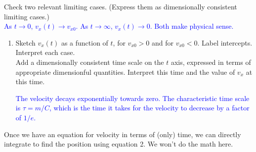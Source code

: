 \documentclass[11pt, letterpaper, openany]{book}
\newenvironment{exercise}[1][Exercise]{%
  \tcolorbox[blanker, breakable, left=1em,
    before skip=1em, after skip=1em,
    borderline west={3pt}{0pt}{PhysNavy},
    colback=PhysCream,
    before upper={\textcolor{PhysNavy}{\sffamily\bfseries #1:}\space}
  ]%
}{%
  \endtcolorbox%
}
\begin{document}
\begin{exercise}[Exercise 1]
Check two relevant limiting cases. (Express them as dimensionally consistent limiting cases.) \\
\textcolor{blue}{As $t \to 0$, $v_x(t) \to v_{x0}$. As $t \to \infty$, $v_x(t) \to 0$. Both make physical sense.}

\begin{enumerate}[label=(\alph*), resume]
    \item Sketch $v_x(t)$ as a function of $t$, for $v_{x0} > 0$ and for $v_{x0} < 0$. Label intercepts. Interpret each case. \\
    Add a dimensionally consistent time scale on the $t$ axis, expressed in terms of appropriate dimensionful quantities. Interpret this time and the value of $v_x$ at this time.
    
    \begin{center}
    \end{center}
    \textcolor{blue}{The velocity decays exponentially towards zero. The characteristic time scale is $\tau = m/C$, which is the time it takes for the velocity to decrease by a factor of $1/e$.}
\end{enumerate}

Once we have an equation for velocity in terms of (only) time, we can directly integrate to find the position using equation 2. We won't do the math here.
\end{exercise}
\end{document}
